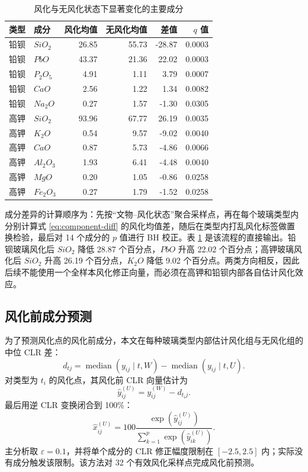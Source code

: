 \documentclass[UTF8,zihao=-4,a4paper,fontset=fandol]{ctexart}
\begin{document}
\begin{table}[H]
  \centering
  \caption{风化与无风化状态下显著变化的主要成分}
  \label{tab:q1-component}
  \begin{tabular}{llrrrr}
    \toprule
    类型 & 成分 & 风化均值 & 无风化均值 & 差值 & $q$ 值 \\
    \midrule
    铅钡 & $SiO_2$ & 26.85 & 55.73 & -28.87 & 0.0003 \\
    铅钡 & $PbO$ & 43.37 & 21.36 & 22.02 & 0.0003 \\
    铅钡 & $P_2O_5$ & 4.91 & 1.11 & 3.79 & 0.0007 \\
    铅钡 & $CaO$ & 2.56 & 1.22 & 1.34 & 0.0082 \\
    铅钡 & $Na_2O$ & 0.27 & 1.57 & -1.30 & 0.0305 \\
    高钾 & $SiO_2$ & 93.96 & 67.77 & 26.19 & 0.0035 \\
    高钾 & $K_2O$ & 0.54 & 9.57 & -9.02 & 0.0040 \\
    高钾 & $CaO$ & 0.87 & 5.73 & -4.86 & 0.0066 \\
    高钾 & $Al_2O_3$ & 1.93 & 6.41 & -4.48 & 0.0040 \\
    高钾 & $MgO$ & 0.20 & 1.05 & -0.86 & 0.0258 \\
    高钾 & $Fe_2O_3$ & 0.27 & 1.79 & -1.52 & 0.0258 \\
    \bottomrule
  \end{tabular}
\end{table}

成分差异的计算顺序为：先按“文物--风化状态”聚合采样点，再在每个玻璃类型内分别计算式 \eqref{eq:component-diff} 的风化均值差，随后在类型内打乱风化标签做置换检验，最后对 14 个成分的 $p$ 值进行 BH 校正。表 \ref{tab:q1-component} 是该流程的直接输出。铅钡玻璃风化后 $SiO_2$ 降低 28.87 个百分点，$PbO$ 升高 22.02 个百分点；高钾玻璃风化后 $SiO_2$ 升高 26.19 个百分点，$K_2O$ 降低 9.02 个百分点。两类方向相反，因此后续不能使用一个全样本风化修正向量，而必须在高钾和铅钡内部各自估计风化效应。

\subsection{风化前成分预测}

为了预测风化点的风化前成分，本文在每种玻璃类型内部估计风化组与无风化组的中位 CLR 差：
\begin{equation}
  d_{tj}=\operatorname{median}(y_{ij}\mid t,W)-\operatorname{median}(y_{ij}\mid t,U).
  \label{eq:weather-effect}
\end{equation}
对类型为 $t_i$ 的风化点，其风化前 CLR 向量估计为
\begin{equation}
  \hat y_{ij}^{(U)}=y_{ij}^{(W)}-d_{t_i j}.
  \label{eq:preweather-clr}
\end{equation}
最后用逆 CLR 变换闭合到 100\%：
\begin{equation}
  \hat x_{ij}^{(U)}=100\frac{\exp(\hat y_{ij}^{(U)})}{\sum_{k=1}^{p}\exp(\hat y_{ik}^{(U)})}.
  \label{eq:inverse-clr}
\end{equation}
主分析取 $\varepsilon=0.1$，并将单个成分的 CLR 修正幅度限制在 $[-2.5,2.5]$ 内；实际没有成分触发该限制。该方法对 32 个有效风化采样点完成风化前预测。
\end{document}
